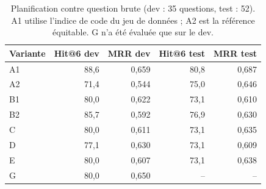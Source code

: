 \begin{table}[H]
\centering
\small
\begin{tabular}{lrrrr}
\toprule
Variante & Hit@6 dev & MRR dev & Hit@6 test & MRR test \\
\midrule
A1 & 88{,}6 & 0{,}659 & 80{,}8 & 0{,}687 \\
A2 & 71{,}4 & 0{,}544 & 75{,}0 & 0{,}646 \\
B1 & 80{,}0 & 0{,}622 & 73{,}1 & 0{,}610 \\
B2 & 85{,}7 & 0{,}592 & 76{,}9 & 0{,}630 \\
C & 80{,}0 & 0{,}611 & 73{,}1 & 0{,}635 \\
D & 77{,}1 & 0{,}630 & 73{,}1 & 0{,}609 \\
E & 80{,}0 & 0{,}607 & 73{,}1 & 0{,}638 \\
G & 80{,}0 & 0{,}650 & -- & -- \\
\bottomrule
\end{tabular}
\caption{Planification contre question brute (dev : 35 questions, test : 52). A1 utilise l'indice de code du jeu de données ; A2 est la référence équitable. G n'a été évaluée que sur le dev.}
\label{tab:plan}
\end{table}

